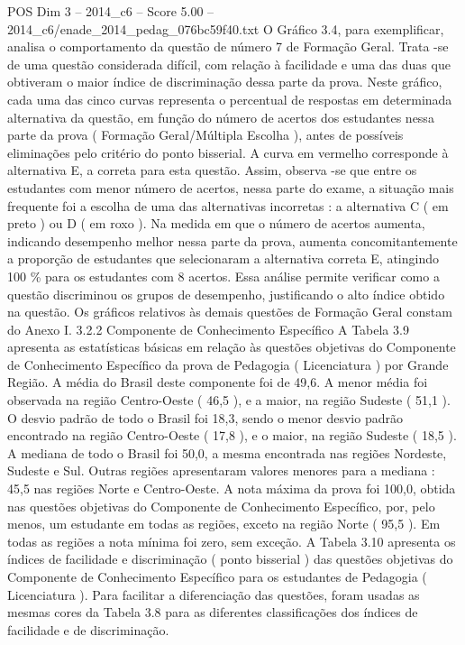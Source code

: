 \begin{textsample}{POS Dim 3 – 2014\_c6 – Score 5.00 – 2014\_c6/enade\_2014\_pedag\_076bc59f40.txt}
O Gráfico 3.4, para exemplificar, analisa o comportamento da questão de número 7 de Formação Geral.
Trata -se de uma questão considerada difícil, com relação à facilidade e uma das duas que obtiveram o maior índice de discriminação dessa parte da prova.
Neste gráfico, cada uma das cinco curvas representa o percentual de respostas em determinada alternativa da questão, em função do número de acertos dos estudantes nessa parte da prova ( Formação Geral/Múltipla Escolha ), antes de possíveis eliminações pelo critério do ponto bisserial.
A curva em vermelho corresponde à alternativa E, a correta para esta questão.
Assim, observa -se que entre os estudantes com menor número de acertos, nessa parte do exame, a situação mais frequente foi a escolha de uma das alternativas incorretas : a alternativa C ( em preto ) ou D ( em roxo ).
Na medida em que o número de acertos aumenta, indicando desempenho melhor nessa parte da prova, aumenta concomitantemente a proporção de estudantes que selecionaram a alternativa correta E, atingindo 100 \% para os estudantes com 8 acertos.
Essa análise permite verificar como a questão discriminou os grupos de desempenho, justificando o alto índice obtido na questão.
Os gráficos relativos às demais questões de Formação Geral constam do Anexo I. 3.2.2 Componente de Conhecimento Específico A Tabela 3.9 apresenta as estatísticas básicas em relação às questões objetivas do Componente de Conhecimento Específico da prova de Pedagogia ( Licenciatura ) por Grande Região.
A média do Brasil deste componente foi de 49,6.
A menor média foi observada na região Centro-Oeste ( 46,5 ), e a maior, na região Sudeste ( 51,1 ).
O desvio padrão de todo o Brasil foi 18,3, sendo o menor desvio padrão encontrado na região Centro-Oeste ( 17,8 ), e o maior, na região Sudeste ( 18,5 ).
A mediana de todo o Brasil foi 50,0, a mesma encontrada nas regiões Nordeste, Sudeste e Sul.
Outras regiões apresentaram valores menores para a mediana : 45,5 nas regiões Norte e Centro-Oeste.
A nota máxima da prova foi 100,0, obtida nas questões objetivas do Componente de Conhecimento Específico, por, pelo menos, um estudante em todas as regiões, exceto na região Norte ( 95,5 ).
Em todas as regiões a nota mínima foi zero, sem exceção.
A Tabela 3.10 apresenta os índices de facilidade e discriminação ( ponto bisserial ) das questões objetivas do Componente de Conhecimento Específico para os estudantes de Pedagogia ( Licenciatura ).
Para facilitar a diferenciação das questões, foram usadas as mesmas cores da Tabela 3.8 para as diferentes classificações dos índices de facilidade e de discriminação.

\end{textsample}
